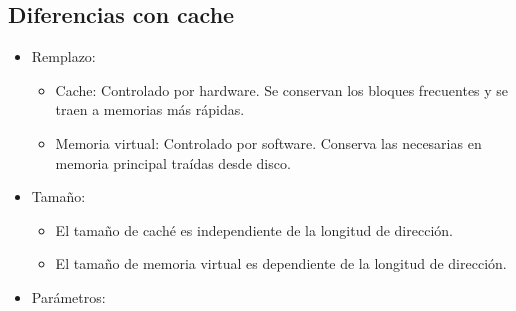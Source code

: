 \documentclass[12pt, twoside, openright]{report} %
\begin{document}
\subsection{Diferencias con cache}

\begin{itemize}

	\item Remplazo:

	      \begin{itemize}

		      \item Cache: Controlado por hardware. Se conservan los bloques
		            frecuentes y se traen a memorias más rápidas.
		      \item Memoria virtual: Controlado por software. Conserva las
		            necesarias en memoria principal traídas desde disco.
	      \end{itemize}
	\item Tamaño:

	      \begin{itemize}

		      \item El tamaño de caché es independiente de la longitud de dirección.
		      \item El tamaño de memoria virtual es dependiente de la longitud de
		            dirección.
	      \end{itemize}
	\item Parámetros:


\end{itemize}
\end{document}

